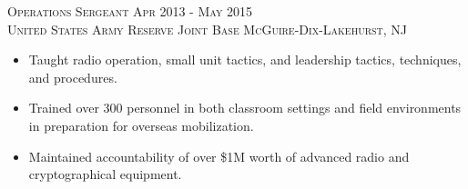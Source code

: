 \documentclass[letterpaper, 10pt]{article} %
\begin{document}

\textsc{Operations Sergeant \hfill Apr 2013 - May 2015} \\
\textsc{United States Army Reserve \hfill Joint Base McGuire-Dix-Lakehurst, NJ}
\begin{itemize}
 \item Taught radio operation, small unit tactics, and leadership tactics, techniques, and procedures.
 \item Trained over 300 personnel in both classroom settings and field environments in preparation for overseas mobilization.
 \item Maintained accountability of over \$1M worth of advanced radio and cryptographical equipment.
\end{itemize}




\hrulefill
\end{document}

